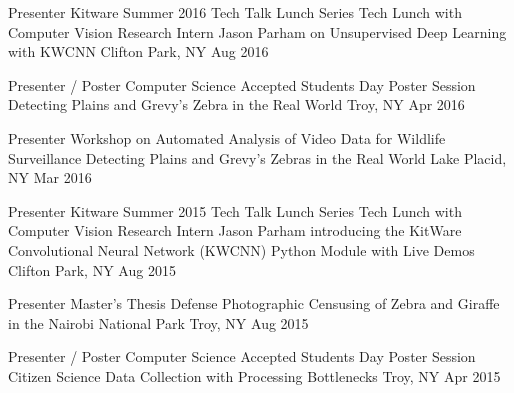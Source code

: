 

\begin{cventries}


  \cventryshort
    {Presenter \dotSep Kitware Summer 2016 Tech Talk Lunch Series} %
    {Tech Lunch with Computer Vision Research Intern Jason Parham on Unsupervised Deep Learning with KWCNN} %
    {Clifton Park, NY} %
    {Aug 2016} %

  \cventryshort
    {Presenter / Poster \dotSep Computer Science Accepted Students Day Poster Session} %
    {Detecting Plains and Grevy's Zebra in the Real World} %
    {Troy, NY} %
    {Apr 2016} %

  \cventryshort
    {Presenter \dotSep {} Workshop on Automated Analysis of Video Data for Wildlife Surveillance} %
    {Detecting Plains and Grevy's Zebras in the Real World} %
    {Lake Placid, NY} %
    {Mar 2016} %

  \cventryshort
    {Presenter \dotSep Kitware Summer 2015 Tech Talk Lunch Series} %
    {Tech Lunch with Computer Vision Research Intern Jason Parham introducing the KitWare Convolutional Neural Network (KWCNN) Python Module with Live Demos} %
    {Clifton Park, NY} %
    {Aug 2015} %

  \cventryshort
    {Presenter \dotSep Master's Thesis Defense} %
    {Photographic Censusing of Zebra and Giraffe in the Nairobi National Park} %
    {Troy, NY} %
    {Aug 2015} %

  \cventryshort
    {Presenter / Poster \dotSep Computer Science Accepted Students Day Poster Session} %
    {Citizen Science Data Collection with Processing Bottlenecks} %
    {Troy, NY} %
    {Apr 2015} %

\end{cventries}
